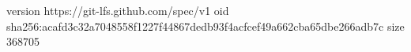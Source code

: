 version https://git-lfs.github.com/spec/v1
oid sha256:acafd3c32a7048558f1227f44867dedb93f4acfcef49a662cba65dbe266adb7c
size 368705
